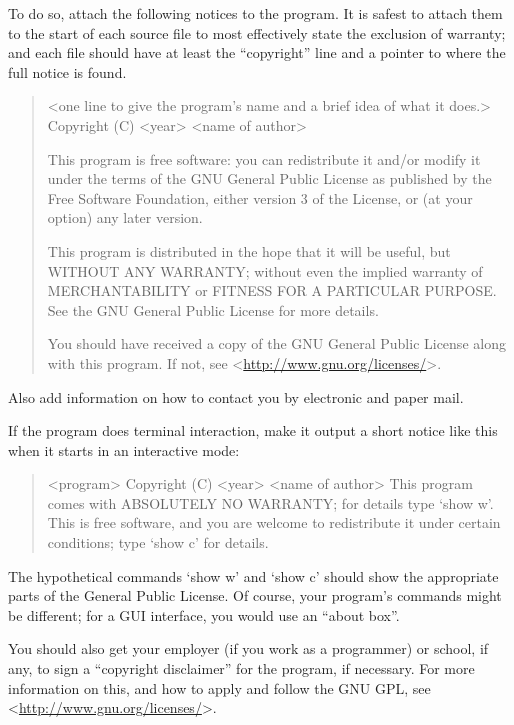 \documentclass[letterpaper,10pt,english]{sphinxmanual}
\begin{document}
To do so, attach the following notices to the program.  It is safest
to attach them to the start of each source file to most effectively
state the exclusion of warranty; and each file should have at least
the ``copyright'' line and a pointer to where the full notice is found.
\begin{quote}

\textless{}one line to give the program's name and a brief idea of what it does.\textgreater{}
Copyright (C) \textless{}year\textgreater{}  \textless{}name of author\textgreater{}

This program is free software: you can redistribute it and/or modify
it under the terms of the GNU General Public License as published by
the Free Software Foundation, either version 3 of the License, or
(at your option) any later version.

This program is distributed in the hope that it will be useful,
but WITHOUT ANY WARRANTY; without even the implied warranty of
MERCHANTABILITY or FITNESS FOR A PARTICULAR PURPOSE.  See the
GNU General Public License for more details.

You should have received a copy of the GNU General Public License
along with this program.  If not, see \textless{}\url{http://www.gnu.org/licenses/}\textgreater{}.
\end{quote}

Also add information on how to contact you by electronic and paper mail.

If the program does terminal interaction, make it output a short
notice like this when it starts in an interactive mode:
\begin{quote}

\textless{}program\textgreater{}  Copyright (C) \textless{}year\textgreater{}  \textless{}name of author\textgreater{}
This program comes with ABSOLUTELY NO WARRANTY; for details type `show w'.
This is free software, and you are welcome to redistribute it
under certain conditions; type `show c' for details.
\end{quote}

The hypothetical commands `show w' and `show c' should show the appropriate
parts of the General Public License.  Of course, your program's commands
might be different; for a GUI interface, you would use an ``about box''.

You should also get your employer (if you work as a programmer) or school,
if any, to sign a ``copyright disclaimer'' for the program, if necessary.
For more information on this, and how to apply and follow the GNU GPL, see
\textless{}\url{http://www.gnu.org/licenses/}\textgreater{}.
\end{document}
